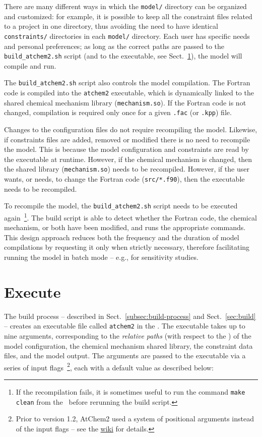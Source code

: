 There are many different ways in which the \texttt{model/} directory
can be organized and customized: for example, it is possible to keep
all the constraint files related to a project in one directory, thus
avoiding the need to have identical \texttt{constraints/} directories
in each \texttt{model/} directory. Each user has specific needs and
personal preferences; as long as the correct paths are passed to the
\texttt{build\_atchem2.sh} script (and to the executable, see
Sect.~\ref{sec:execute}), the model will compile and run.

The \texttt{build\_atchem2.sh} script also controls the model
compilation. The Fortran code is compiled into the \texttt{atchem2}
executable, which is dynamically linked to the shared chemical
mechanism library (\texttt{mechanism.so}). If the Fortran code is not
changed, compilation is required only once for a given \texttt{.fac}
(or \texttt{.kpp}) file.

Changes to the configuration files do not require recompiling the
model. Likewise, if constraints files are added, removed or modified
there is no need to recompile the model. This is because the model
configuration and constraints are read by the executable at
runtime. However, if the chemical mechanism is changed, then the
shared library (\texttt{mechanism.so}) needs to be recompiled.
However, if the user wants, or needs, to change the Fortran code
(\texttt{src/*.f90}), then the executable needs to be recompiled.

To recompile the model, the \texttt{build\_atchem2.sh} script needs to
be executed again~\footnote{If the recompilation fails, it is
  sometimes useful to run the command \texttt{make clean} from the
  \maindir\ before rerunning the build script.}. The build script is
able to detect whether the Fortran code, the chemical mechanism, or
both have been modified, and runs the appropriate commands. This
design approach reduces both the frequency and the duration of model
compilations by requesting it only when strictly necessary, therefore
facilitating running the model in batch mode -- e.g., for sensitivity
studies.

\section{Execute} \label{sec:execute}

The build process -- described in Sect.~\ref{subsec:build-process} and
Sect.~\ref{sec:build} -- creates an executable file called
\texttt{atchem2} in the \maindir. The executable takes up to nine
arguments, corresponding to the \emph{relative paths} (with respect to
the \maindir) of the model configuration, the chemical mechanism
shared library, the constraint data files, and the model output. The
arguments are passed to the executable via a series of input
flags~\footnote{Prior to version 1.2, AtChem2 used a system of
  positional arguments instead of the input flags -- see the
  \href{https://github.com/AtChem/AtChem2/wiki/How-to-run-AtChem2}{wiki}
  for details.}, each with a default value as described below:

